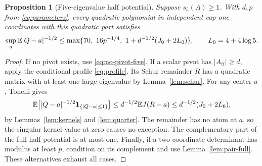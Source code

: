 \documentclass[11pt]{article}
\numberwithin{equation}{section}
\newtheorem{proposition}[theorem]{Proposition}
\theoremstyle{definition}\newtheorem{definition}[theorem]{Definition}
\theoremstyle{remark}\newtheorem{remark}[theorem]{Remark}
\newcommand{\1}{\mathbf 1}\newcommand{\diag}{\operatorname{diag}}
\begin{document}
\begin{proposition}[Five-eigenvalue half potential]\label{prop:five}
Suppose $s_5(A)\ge1$. With $d,p$ from \eqref{eq:parameters}, every quadratic polynomial in independent cap-one coordinates with this quadratic part satisfies
\begin{equation}\label{eq:five-half}
 \sup_a\mathbb E|Q-a|^{-1/2}
 \le \max\{70,\ 16p^{-1/4},\ 1+d^{-1/2}(J_0+2L_0)\},
 \qquad L_0=4+4\log5.
\end{equation}
\end{proposition}
\begin{proof}
If no pivot exists, use \eqref{eq:no-pivot-five}. If a scalar pivot has $|A_{ii}|\ge d$, apply the conditional profile \eqref{eq:profile}. Its Schur remainder $R$ has a quadratic matrix with at least one large eigenvalue by Lemma~\ref{lem:schur}. For any center $a$, Tonelli gives
\[
 \E\bigl[|Q-a|^{-1/2}\1_{\{|Q-a|\le1\}}\bigr]
 \le d^{-1/2}\E J(R-a)
 \le d^{-1/2}(J_0+2L_0),
\]
by Lemmas~\ref{lem:kernels} and \ref{lem:quarter}. The remainder has no atom at $a$, so the singular kernel value at zero causes no exception. The complementary part of the full half potential is at most one. Finally, if a two-coordinate determinant has modulus at least $p$, condition on its complement and use Lemma~\ref{lem:pair-full}. These alternatives exhaust all cases.
\end{proof}
\end{document}
